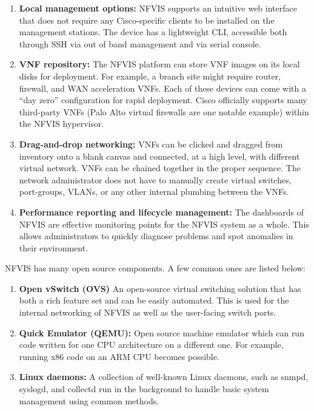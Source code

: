 \begin{enumerate}
  \item \textbf{Local management options:} NFVIS supports an intuitive web interface
  that does not require any Cisco-specific clients to be installed on the
  management stations. The device has a lightweight CLI, accessible both through
  SSH via out of band management and via serial console.
  \item \textbf{VNF repository:} The NFVIS platform can store VNF images on its
  local disks for deployment. For example, a branch site might require router,
  firewall, and WAN acceleration VNFs. Each of these devices can come with a
  ``day zero'' configuration for rapid deployment. Cisco officially supports
  many third-party VNFs (Palo Alto virtual firewalls are one notable example)
  within the NFVIS hypervisor.
  \item \textbf{Drag-and-drop networking:} VNFs can be clicked and dragged from
  inventory onto a blank canvas and connected, at a high level, with different
  virtual network. VNFs can be chained together in the proper sequence. The
  network administrator does not have to manually create virtual switches,
  port-groups, VLANs, or any other internal plumbing between the VNFs.
  \item \textbf{Performance reporting and lifecycle management:} The dashboards
  of NFVIS are effective monitoring points for the NFVIS system as a whole. This
  allows administrators to quickly diagnose problems and spot anomalies in their
  environment.
\end{enumerate}

NFVIS has many open source components. A few common ones are listed below:

\begin{enumerate}
  \item \textbf{Open vSwitch (OVS)} An open-source virtual switching solution that
  has both a rich feature set and can be easily automated. This is used for the
  internal networking of NFVIS as well as the user-facing switch ports.
  \item \textbf{Quick Emulator (QEMU):} Open source machine emulator which can run
  code written for one CPU architecture on a different one. For example, running x86
  code on an ARM CPU becomes possible.
  \item \textbf{Linux daemons:} A collection of well-known Linux daemons, such as
  snmpd, syslogd, and collectd run in the background to handle basic system
  management using common methods.
\end{enumerate}

